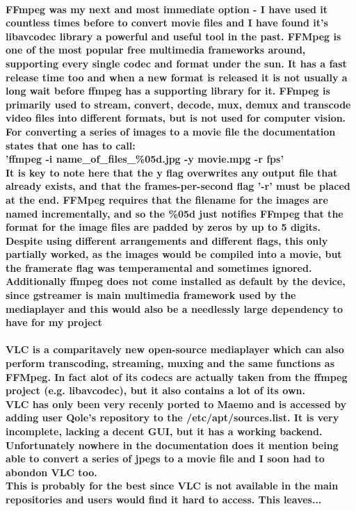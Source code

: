 \paragraph{ {\bf FFmpeg} was my next and most immediate option - I have used it countless times before to convert movie files and I have found it's libavcodec library a powerful and useful tool in the past. FFMpeg is one of the most popular free multimedia frameworks around, supporting every single codec and format under the sun. It has a fast release time too and when a new format is released it is not usually a long wait before ffmpeg has a supporting library for it. FFmpeg is primarily used to stream, convert, decode, mux, demux and transcode video files into different formats, but is not used for computer vision.\\
For converting a series of images to a movie file the documentation states that one has to call:\\
'ffmpeg -i name\_of\_files\_\%05d.jpg -y movie.mpg -r fps'\\
It is key to note here that the y flag overwrites any output file that already exists, and that the frames-per-second flag '-r' must be placed at the end. FFMpeg requires that the filename for the images are named incrementally, and so the \%05d just notifies FFmpeg that the format for the image files are padded by zeros by up to 5 digits.\\
Despite using different arrangements and different flags, this only partially worked, as the images would be compiled into a movie, but the framerate flag was temperamental and sometimes ignored.\\
Additionally ffmpeg does not come installed as default by the device, since gstreamer is main multimedia framework used by the mediaplayer and this would also be a needlessly large dependency to have for my project
}
\paragraph{ {\bf VLC} is a comparitavely new open-source mediaplayer which can also perform transcoding, streaming, muxing and the same functions as FFMpeg. In fact alot of its codecs are actually taken from the ffmpeg project (e.g. libavcodec), but it also contains a lot of its own.\\
VLC has only been very recenly ported to Maemo and is accessed by adding user Qole's repository to the /etc/apt/sources.list. It is very incomplete, lacking a decent GUI, but it has a working backend. Unfortunately nowhere in the documentation does it mention being able to convert a series of jpegs to a movie file and I soon had to abondon VLC too.\\ This is probably for the best since VLC is not available in the main repositories and users would find it hard to access. This leaves...}
